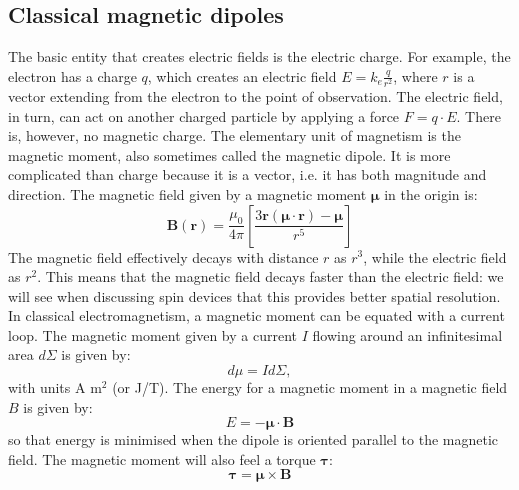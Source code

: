 \documentclass[a4paper,11pt]{article}
\begin{document}
\subsection {Classical magnetic dipoles}
The basic entity that creates electric fields is the electric charge. For example, the electron has a charge $q$, which creates an electric  field  $E = k_e \frac{q}{r^2} $, where $r$ is a vector extending from the electron to the point of  observation. The electric field, in turn, can act on another charged particle by applying a force $F = q \cdot E$.
\newline There  is,  however,  no  magnetic  charge.  The elementary  unit  of  magnetism  is  the magnetic moment,  also  sometimes  called  the magnetic dipole. It is more complicated than charge because it is a vector, i.e. it has both magnitude and direction. The magnetic field given by a magnetic moment $\mathbf{\mu}$ in the origin is:
\begin{equation}
    \mathbf{B}(\mathbf{r}) = \frac{\mu_0}{4\pi} \left[ \frac{3 \mathbf{r} (\mathbf{\mu} \cdot \mathbf{r})-\mathbf{\mu}}{r^5}\right]
\end{equation}
\newline The magnetic field effectively decays with distance $r$ as $r^3$, while the electric field as $r^2$. This means that the magnetic field decays faster than the electric field: we will see when discussing spin devices that this provides better spatial resolution.
\newline In classical electromagnetism, a magnetic moment can be equated with a current loop. The magnetic moment given by a current $I$ flowing around an infinitesimal area $d\Sigma$ is given by:
\begin{equation}
    d \mu = I d\Sigma,
\end{equation}
with units A m$^2$ (or J/T).
\newline The energy for a magnetic moment in a magnetic field {\bf $B$} is given by:
\begin{equation}
    E = - \mathbf {\mu} \cdot \mathbf {B}
\end{equation}
so that energy is minimised when the dipole is oriented parallel to the magnetic field. The magnetic moment will also feel a torque $\mathbf{\tau}$:
\begin{equation}
    \mathbf{\tau} = \mathbf{\mu} \times \mathbf{B}
\end{equation}
\end{document}
